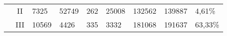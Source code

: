 \begin{tabular}{cclllllll}
                                                                                           & II                                 & 7325                        & 52749                       & 262                         & 25008                        & 132562     & 139887                                                                                                          & 4,61\%                                                                                                            \\
                                                                                           & III                                & 10569                       & 4426                        & 335                         & 3332                         & 181068     & 191637                                                                                                          & 63,33\%                                                                                                           \\
    \bottomrule
    \end{tabular}